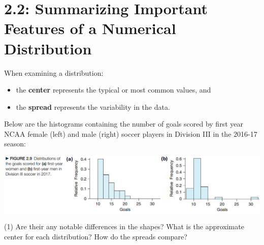 \documentclass[../mathNotesPreamble]{subfiles}
\providecommand{\relscalefact}{1.4}
\begin{document}
\relscale{\relscalefact}
  \section{2.2: Summarizing Important Features of a Numerical Distribution}
  \begin{defn*}
    When examining a distribution:
    \begin{itemize}
      \item the \textbf{center} represents the typical or most common values, and
      \item the \textbf{spread} represents the variability in the data.
    \end{itemize}
  \end{defn*}
  \begin{ex*}
    Below are the histograms containing the number of goals scored by first year NCAA female (left) and male (right) soccer players in Division III in the 2016-17 season:
  \end{ex*}
  \begin{center}
    \includegraphics[width=0.975\linewidth]{images/math211_figure_2p09}
  \end{center}
  \begin{tasks}[after-item-skip=\stretch{1}, label=--](1)
    \task Are their any notable differences in the shapes?
    \task What is the approximate center for each distribution?
    \task How do the spreads compare?
  \end{tasks}
  \pagebreak
\end{document}
